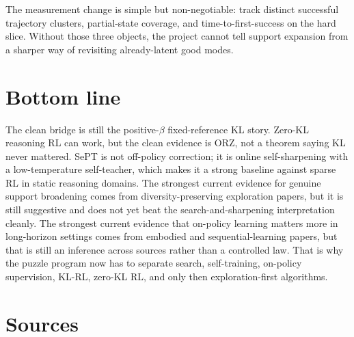 \documentclass[11pt]{article}
\begin{document}
The measurement change is simple but non-negotiable: track distinct successful trajectory clusters, partial-state coverage, and time-to-first-success on the hard slice. Without those three objects, the project cannot tell support expansion from a sharper way of revisiting already-latent good modes.

\section*{Bottom line}

The clean bridge is still the positive-$\beta$ fixed-reference KL story. Zero-KL reasoning RL can work, but the clean evidence is ORZ, not a theorem saying KL never mattered. SePT is not off-policy correction; it is online self-sharpening with a low-temperature self-teacher, which makes it a strong baseline against sparse RL in static reasoning domains. The strongest current evidence for genuine support broadening comes from diversity-preserving exploration papers, but it is still suggestive and does not yet beat the search-and-sharpening interpretation cleanly. The strongest current evidence that on-policy learning matters more in long-horizon settings comes from embodied and sequential-learning papers, but that is still an inference across sources rather than a controlled law. That is why the puzzle program now has to separate search, self-training, on-policy supervision, KL-RL, zero-KL RL, and only then exploration-first algorithms.

\section*{Sources}
\end{document}
